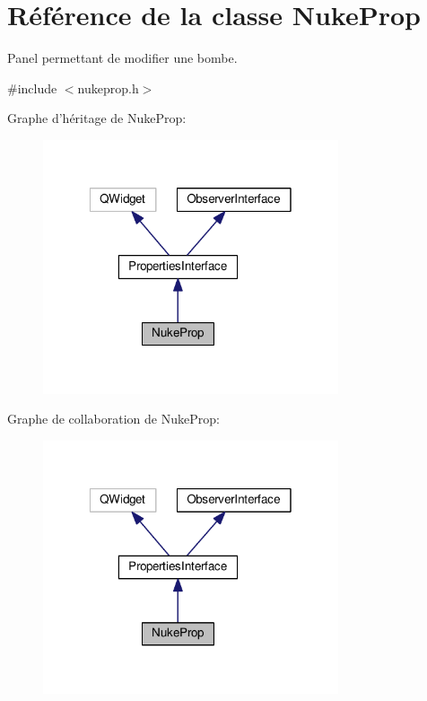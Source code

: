 \hypertarget{classNukeProp}{\section{Référence de la classe Nuke\+Prop}
\label{classNukeProp}
}


Panel permettant de modifier une bombe.  




{\ttfamily \#include $<$nukeprop.\+h$>$}



Graphe d'héritage de Nuke\+Prop\+:\nopagebreak
\begin{figure}[H]
\begin{center}
\leavevmode
\includegraphics[width=247pt]{dc/d49/classNukeProp__inherit__graph}
\end{center}
\end{figure}


Graphe de collaboration de Nuke\+Prop\+:\nopagebreak
\begin{figure}[H]
\begin{center}
\leavevmode
\includegraphics[width=247pt]{d0/db8/classNukeProp__coll__graph}
\end{center}
\end{figure}
